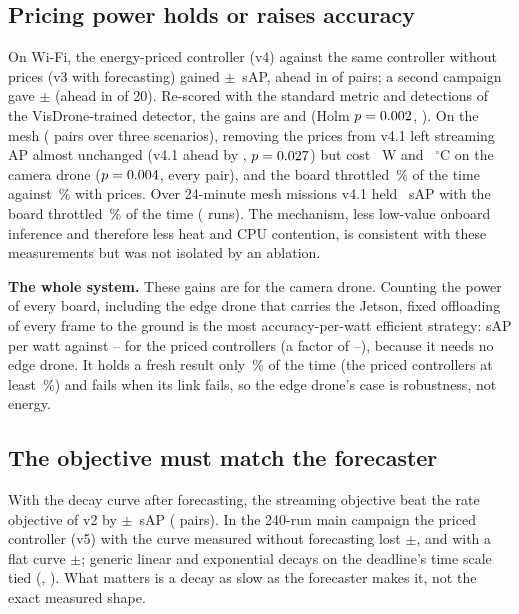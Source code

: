 \documentclass[conference]{IEEEtran}
\begin{document}
\subsection{Pricing power holds or raises accuracy}\label{sec:energy}
On Wi-Fi, the energy-priced controller (v4) against the same controller without prices (v3 with forecasting) gained
\EnGain{}$\pm$\EnGainCi{}~sAP, ahead in \EnWins{} of \EnPairs{} pairs; a second campaign gave
\EnRepGain{}$\pm$\EnRepCi{} (ahead in \EnRepWins{} of 20). Re-scored with the standard metric and detections of the
VisDrone-trained detector, the gains are \EnVdGain{} and \EnRepVdGain{} (Holm $p=0.002{}$, \EnRepVdHolm{}). On the
mesh (\MeshPairs{} pairs over three scenarios), removing the prices from v4.1 left streaming AP almost unchanged
(v4.1 ahead by \MeshNoPriceSap{}, $p=0.027{}$) but cost \MeshNoPriceW{}~W and \MeshNoPriceC{}~$^\circ$C on the
camera drone ($p=0.004{}$, every pair), and the board throttled \MeshNoPriceThrottle{}\,\% of the time against
\MeshVThrottle{}\,\% with prices. Over 24-minute mesh missions v4.1 held \MeshLongSap{}~sAP with the board throttled
\MeshLongThrottle{}\,\% of the time (\MeshLongN{} runs). The mechanism, less low-value onboard inference and therefore
less heat and CPU contention, is consistent with these measurements but was not isolated by an ablation.

\textbf{The whole system.} These gains are for the camera drone. Counting the power of every board, including the edge
drone that carries the Jetson, fixed offloading of every frame to the ground is the most accuracy-per-watt efficient
strategy: \SysEffFixed{} sAP per watt against \SysEffMin--\SysEffMax{} for the priced controllers (a factor of
\SysEffRatioMin--\SysEffRatioMax), because it needs no edge drone. It holds a fresh result only \SysFixedAvail\,\% of
the time (the priced controllers at least \SysVAvailMin\,\%) and fails when its link fails, so the edge drone's case is
robustness, not energy.

\subsection{The objective must match the forecaster}\label{sec:decay}
With the decay curve after forecasting, the streaming objective beat the rate objective of v2 by
\FcGain{}$\pm$\FcGainCi{}~sAP (\FcPairs{} pairs). In the 240-run main campaign the priced controller (v5) with the curve
measured without forecasting lost \MainNoFc{}$\pm$\MainNoFcCi{}, and with a flat curve \MainFlat{}$\pm$\MainFlatCi{}; generic
linear and exponential decays on the deadline's time scale tied (\MainLin{}, \MainExp{}). What matters is a decay as
slow as the forecaster makes it, not the exact measured shape.
\end{document}
